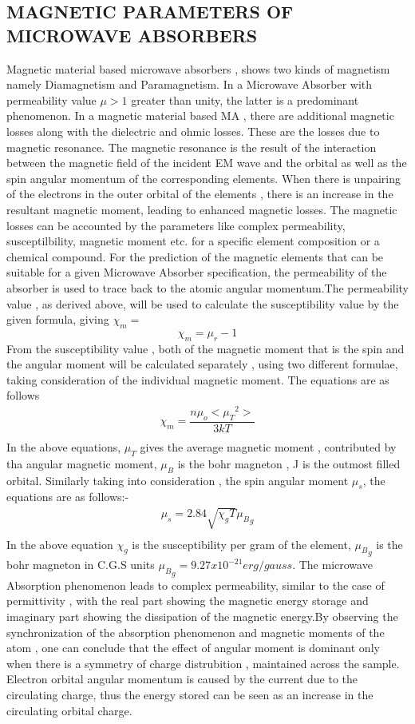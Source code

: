 \documentclass[journal]{IEEEtran}
\begin{document}
\begin{multicols}{2}
\section{MAGNETIC PARAMETERS OF MICROWAVE ABSORBERS}
Magnetic material based microwave absorbers , shows two kinds of magnetism namely Diamagnetism and Paramagnetism. In a Microwave Absorber with permeability value $\mu > 1$ greater than unity, the latter is a predominant phenomenon.
In a magnetic material based MA , there are additional magnetic losses along with the dielectric and ohmic losses. These are the losses due to magnetic resonance. The magnetic resonance is the result of the interaction between the magnetic field of the incident EM wave and the orbital as well as the spin angular momentum of the corresponding elements. When there is unpairing of the electrons in the outer orbital of the elements , there is an increase in the resultant magnetic moment, leading to enhanced magnetic losses. The magnetic losses can be accounted by the parameters like complex  permeability, susceptilbility, magnetic moment etc. for a specific element composition or a chemical compound.
For the prediction of the magnetic elements that can be suitable for a given Microwave Absorber specification, the permeability of the absorber is used to trace back to the atomic angular momentum.The permeability value , as derived above, will be used to calculate the susceptibility value by the given formula, giving $\chi_m = $
$$ \chi_m = \mu_r -1  $$
From  the susceptibility value , both of  the magnetic moment that is the spin and the angular moment will be calculated separately ,  using two different formulae, taking consideration of the individual magnetic moment. The equations are as follows
\begin{align}
\chi_m = \dfrac{n \mu_o {<{\mu_T}^2>}}{3kT} \\
\end{align}
In the above equations, ${\mu_T}$ gives the average magnetic moment , contributed by tha angular magnetic moment, ${\mu_B}$  is the bohr magneton , J is the outmost filled orbital. Similarly taking into consideration , the spin angular moment $\mu_s$, the equations are as follows:-
\begin{align}
\mu_s = 2.84 \sqrt{\chi_g T} {\mu_B}_g\\
\end{align}
In the above equation $\chi_g$ is the susceptibility per gram of the element, ${\mu_B}_g$ is the bohr magneton in C.G.S units ${\mu_B}_g = 9.27 x 10^{-21} erg/gauss$. The microwave Absorption phenomenon leads to complex permeability, similar to the case of permittivity , with the real part  showing the magnetic energy storage and imaginary part showing the dissipation of the magnetic energy.By observing the  synchronization of the absorption phenomenon and magnetic moments of the atom , one can conclude that the effect of angular moment is dominant only when there is a symmetry of charge distrubition , maintained across the sample. Electron orbital angular momentum is caused by the current due to the circulating charge, thus the energy stored can be seen as an increase in the circulating orbital charge.

\end{multicols}
\end{document}
